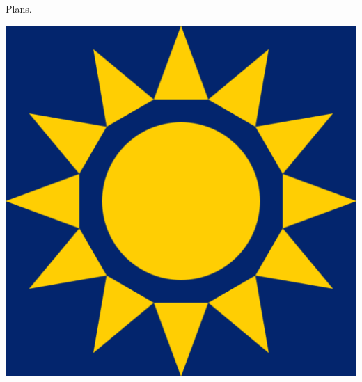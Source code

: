 \documentclass{beamer}
\begin{document}
\begin{frame}{Plans.}
\begin{center}
        \includegraphics[height=0.2\textheight]{static/pycon-namibia.png}

    \end{center}
\end{frame}
\end{document}
